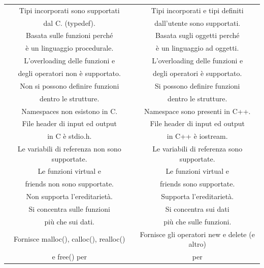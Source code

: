 \begin{longtable}{|c|c|}
	\hline
	\textsf{\small Tipi incorporati sono supportati} & \textsf{\small Tipi incorporati e tipi definiti} \\
	\textsf{\small dal C. (typedef).} & \textsf{\small dall'utente sono supportati.} \\
	\hline
	\textsf{\small Basata sulle funzioni perché} & \textsf{\small Basata sugli oggetti perché} \\
	\textsf{\small è un linguaggio procedurale.} & \textsf{\small è un linguaggio ad oggetti.} \\
	\hline
	\textsf{\small L'overloading delle funzioni e} & \textsf{\small L'overloading delle funzioni e} \\
	\textsf{\small degli operatori non è supportato.} & \textsf{\small degli operatori è supportato.} \\
	\hline
	\textsf{\small Non si possono definire funzioni} & \textsf{\small Si possono definire funzioni} \\
	\textsf{\small dentro le strutture.} & \textsf{\small dentro le strutture.} \\
	\hline
	\textsf{\small Namespaces non esistono in C.} & \textsf{\small Namespace sono presenti in C++.} \\
	\textsf{\small File header di input ed output} & \textsf{\small File header di input ed output} \\
	\textsf{\small in C è stdio.h.} & \textsf{\small in C++ è iostream.} \\
	\hline
	\textsf{\small Le variabili di referenza non sono supportate.} & \textsf{\small Le variabili di referenza sono supportate.} \\
	\hline
	\textsf{\small Le funzioni virtual e} & \textsf{\small Le funzioni virtual e} \\
	\textsf{\small friends non sono supportate.} & \textsf{\small friends sono supportate.} \\
	\hline
	\textsf{\small Non supporta l'ereditarietà.} & \textsf{\small Supporta l'ereditarietà.} \\
	\hline
	\textsf{\small Si concentra sulle funzioni} & \textsf{\small Si concentra sui dati} \\
	\textsf{\small più che sui dati.} & \textsf{\small più che sulle funzioni.} \\
	\hline
	\textsf{\small Fornisce malloc(), calloc(), realloc()} & \textsf{\small Fornisce gli operatori new e delete (e altro)} \\
	\textsf{\small e free() per } & \textsf{\small per  } \\

\end{longtable}
